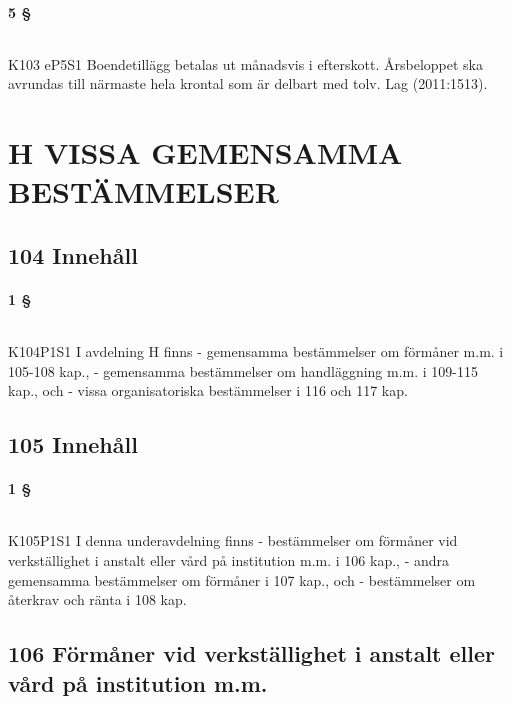 \documentclass[a4paper,notitlepage,openany,10pt]{book}
\begin{document}
\subsection*{5 §}
\paragraph*{}
{\tiny K103 eP5S1}
Boendetillägg betalas ut månadsvis i efterskott.
Årsbeloppet ska avrundas till närmaste hela krontal som är delbart med tolv.
Lag (2011:1513).
\part*{H VISSA GEMENSAMMA BESTÄMMELSER}
\chapter*{104 Innehåll}
\subsection*{1 §}
\paragraph*{}
{\tiny K104P1S1}
I avdelning H finns
\newline - gemensamma bestämmelser om förmåner m.m. i 105-108 kap.,
\newline - gemensamma bestämmelser om handläggning m.m. i 109-115 kap., och
\newline - vissa organisatoriska bestämmelser i 116 och 117 kap.
\chapter*{105 Innehåll}
\subsection*{1 §}
\paragraph*{}
{\tiny K105P1S1}
I denna underavdelning finns
\newline - bestämmelser om förmåner vid verkställighet i anstalt eller vård på institution m.m. i 106 kap.,
\newline - andra gemensamma bestämmelser om förmåner i 107 kap., och
\newline - bestämmelser om återkrav och ränta i 108 kap.
\chapter*{106 Förmåner vid verkställighet i anstalt eller vård på institution m.m.}
\end{document}
